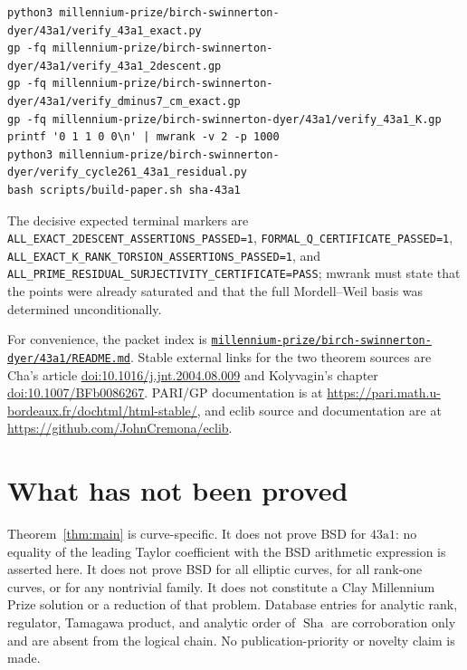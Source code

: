 \documentclass[11pt]{article}
\newcommand{\Sha}{\mathop{\mathrm{Sha}}}
\newcommand{\artifact}[1]{\href{run:../#1}{\nolinkurl{#1}}}
\begin{document}
\begin{verbatim}
python3 millennium-prize/birch-swinnerton-dyer/43a1/verify_43a1_exact.py
gp -fq millennium-prize/birch-swinnerton-dyer/43a1/verify_43a1_2descent.gp
gp -fq millennium-prize/birch-swinnerton-dyer/43a1/verify_dminus7_cm_exact.gp
gp -fq millennium-prize/birch-swinnerton-dyer/43a1/verify_43a1_K.gp
printf '0 1 1 0 0\n' | mwrank -v 2 -p 1000
python3 millennium-prize/birch-swinnerton-dyer/verify_cycle261_43a1_residual.py
bash scripts/build-paper.sh sha-43a1
\end{verbatim}

The decisive expected terminal markers are
\texttt{ALL\_EXACT\_2DESCENT\_ASSERTIONS\_PASSED=1},
\texttt{FORMAL\_Q\_CERTIFICATE\_PASSED=1},
\texttt{ALL\_EXACT\_K\_RANK\_TORSION\_ASSERTIONS\_PASSED=1}, and
\texttt{ALL\_PRIME\_RESIDUAL\_SURJECTIVITY\_CERTIFICATE=PASS}; mwrank must
state that the points were already saturated and that the full Mordell--Weil
basis was determined unconditionally.

For convenience, the packet index is
\artifact{millennium-prize/birch-swinnerton-dyer/43a1/README.md}.  Stable
external links for the two theorem sources are Cha's article
\href{https://doi.org/10.1016/j.jnt.2004.08.009}{doi:10.1016/j.jnt.2004.08.009}
and Kolyvagin's chapter
\href{https://doi.org/10.1007/BFb0086267}{doi:10.1007/BFb0086267}.
PARI/GP documentation is at
\url{https://pari.math.u-bordeaux.fr/dochtml/html-stable/}, and eclib source
and documentation are at \url{https://github.com/JohnCremona/eclib}.

\section{What has not been proved}

Theorem~\ref{thm:main} is curve-specific.  It does not prove BSD for
\(43\mathrm a1\): no equality of the leading Taylor coefficient with the BSD
arithmetic expression is asserted here.  It does not prove BSD for all
elliptic curves, for all rank-one curves, or for any nontrivial family.  It
does not constitute a Clay Millennium Prize solution or a reduction of that
problem.  Database entries for analytic rank, regulator, Tamagawa product,
and analytic order of \(\Sha\) are corroboration only and are absent from the
logical chain.  No publication-priority or novelty claim is made.
\end{document}
